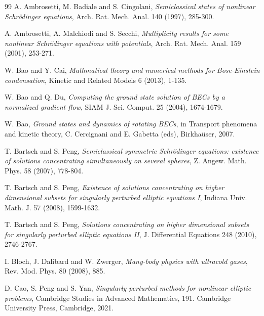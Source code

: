 \documentclass[10pt, reqno]{amsart}
\numberwithin{equation}{section}
\theoremstyle{definition}
\begin{document}
{\begin{thebibliography}{99}
A. Ambrosetti, M. Badiale and S. Cingolani,
\emph{Semiclassical states of nonlinear Schr\"odinger equations},
Arch. Rat. Mech. Anal.
{140} (1997), 285-300.


A. Ambrosetti, A. Malchiodi and S. Secchi,
\emph{Multiplicity results for some nonlinear Schr\"odinger equations with potentials},
Arch. Rat. Mech. Anal.
159 (2001), 253-271.


W. Bao and Y. Cai,
\emph{Mathmatical theory and numerical methods for Bose-Einstein condensation},
Kinetic and Related Models
{6} (2013), 1-135.

W. Bao and Q. Du,
\emph{Computing the ground state solution of BECs by a normalized gradient flow},
SIAM J. Sci. Comput.
25 (2004), 1674-1679.


W. Bao,
\emph{Ground states and dynamics of rotating BECs}, in Transport phenomena and kinetic
theory, C. Cercignani and E. Gabetta (eds), Birkha\"{u}ser, 2007.

T. Bartsch and S. Peng,
\emph{Semiclassical symmetric Schr\"odinger equations: existence of solutions concentrating simultaneously on several spheres},
Z. Angew. Math. Phys.
58 (2007), 778-804.

T. Bartsch and S. Peng,
\emph{Existence of solutions concentrating on higher dimensional subsets for singularly perturbed elliptic equations I},
Indiana Univ. Math. J.
57 (2008), 1599-1632.

T. Bartsch and S. Peng,
\emph{Solutions concentrating on higher dimensional subsets for singularly perturbed elliptic equations II},
J. Differential Equations
248 (2010), 2746-2767.

I. Bloch, J. Dalibard and W. Zwerger,
\emph{Many-body physics with ultracold gases},
Rev. Mod. Phys.
{80} (2008), 885.


D. Cao, S. Peng and S. Yan,
\emph{Singularly perturbed methods for nonlinear elliptic problems},
Cambridge Studies in Advanced Mathematics, 191.
Cambridge University Press, Cambridge, 2021.


\end{thebibliography}}
\end{document}
